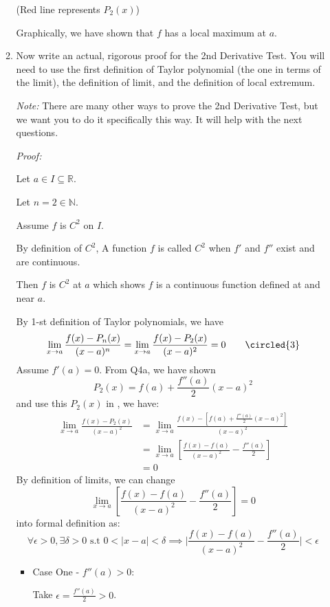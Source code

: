\documentclass[12pt]{exam}
\newcommand{\R}{\mathbb{R}}
\newcommand{\N}{\mathbb{N}}
\begin{document}
\begin{enumerate}
\begin{enumerate}
\begin{center}
			    (Red line represents $P_2(x)$)
			\end{center}
			Graphically, we have shown that $f$ has a local maximum at $a$.
			
			\newpage
			
		\item  \label{qu:pf} Now write an actual, rigorous proof for the 2nd Derivative Test.  You will need to use the first definition of Taylor polynomial (the one in terms of the limit), the definition of limit, and the definition of local extremum.
				
			\emph{Note:}  There are many other ways to prove the 2nd Derivative Test, but we want you to do it specifically this way. It will help with the next questions.
			
			\emph{Proof:}
			
			Let $a \in I\subseteq\R$.
			
			Let $n=2\in\N$.
			
		    Assume $f$ is $C^2$ on $I$.
		    
		    By definition of $C^2$, A function $f$ is called $C^2$ when $f'$ and $f''$ exist and are continuous.
			
			Then $f$ is $C^2$ at $a$ which shows $f$ is a continuous function defined at and near $a$.
			
			By 1-st definition of Taylor polynomials, we have
			$$
			    \lim_{x\to a}\frac{f(x)-P_n(x)}{(x-a)^n}=\lim_{x\to a}\frac{f(x)-P_2(x)}{(x-a)^2}=0\qquad\circled{3}
			$$
			Assume $f'(a) = 0$. From Q4a, we have shown
			$$
			    P_2(x)=f(a)+\frac{f''(a)}{2}(x-a)^2
			$$
			and use this $P_2(x)$ in , we have:
			\begin{align*}
			    \lim_{x\to a}\frac{f(x)-P_2(x)}{(x-a)^2}
			    &=\lim_{x\to a}\frac{f(x)-[f(a)+\frac{f''(a)}{2}(x-a)^2]}{(x-a)^2}\\
			    &=\lim_{x\to a}[\frac{f(x)-f(a)}{(x-a)^2}-\frac{f''(a)}{2}]\\
			    &=0
			\end{align*}
			By definition of limits, we can change
			$$
			    \lim_{x\to a}[\frac{f(x)-f(a)}{(x-a)^2}-\frac{f''(a)}{2}]=0
			$$
			into formal definition as:
			$$
			    \forall\epsilon>0, \exists\delta>0 \mbox{ s.t } 0<\vert{x-a}\vert<\delta\implies\vert{\frac{f(x)-f(a)}{(x-a)^2}-\frac{f''(a)}{2}}\vert<\epsilon
			$$
			\begin{itemize}
			    \item Case One - $f''(a)>0$:
			        
			        Take $\epsilon=\frac{f''(a)}{2}>0$.
			        

\end{itemize}
\end{enumerate}
\end{enumerate}
\end{document}
